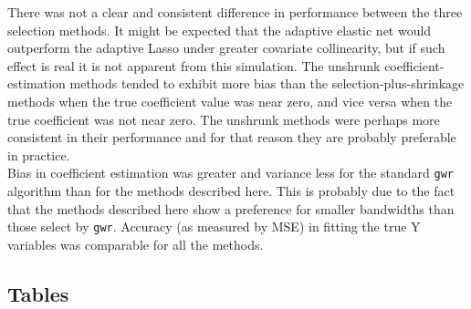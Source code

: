 \documentclass[authoryear, review, 11pt]{elsarticle}
\begin{document}
	There was not a clear and consistent difference in performance between the three selection methods. It might be expected that the adaptive elastic net would outperform the adaptive Lasso under greater covariate collinearity, but if such effect is real it is not apparent from this simulation. The unshrunk coefficient-estimation methods tended to exhibit more bias than the selection-plus-shrinkage methods when the true coefficient value was near zero, and vice versa when the true coefficient was not near zero. The unshrunk methods were perhaps more consistent in their performance and for that reason they are probably preferable in practice.\\
	
	Bias in coefficient estimation was greater and variance less for the standard \verb!gwr! algorithm than for the methods described here. This is probably due to the fact that the methods described here show a preference for smaller bandwidths than those select by \verb!gwr!. Accuracy (as measured by MSE) in fitting the true Y variables was comparable for all the methods. \\	
	
	\subsection{Tables}
\end{document}

